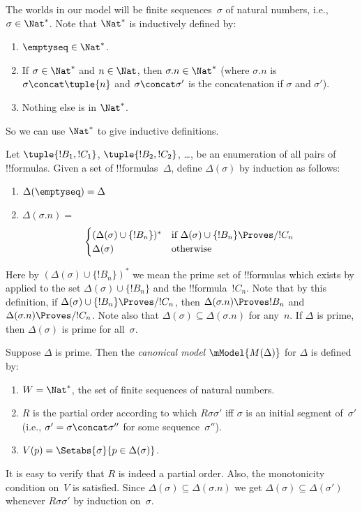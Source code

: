 \documentclass[../../../include/open-logic-section]{subfiles}
\begin{document}


The worlds in our model will be finite sequences~$\sigma$ of natural
numbers, i.e., $\sigma \in \Nat^*$. Note that $\Nat^*$ is inductively
defined by:
\begin{enumerate}
\item $\emptyseq \in \Nat^*$.
\item If $\sigma \in \Nat^*$ and $n \in \Nat$, then $\sigma.n \in
  \Nat^*$ (where $\sigma.n$ is $\sigma \concat \tuple{n}$ and $\sigma \concat \sigma'$ is the concatenation if $\sigma$ and $\sigma'$).
\item Nothing else is in $\Nat^*$.
\end{enumerate}
So we can use $\Nat^*$ to give inductive definitions.

Let $\tuple{!B_1, !C_1}$, $\tuple{!B_2, !C_2}$, \dots, be an
enumeration of all pairs of !!{formula}s. Given a set of
!!{formula}s~$\Delta$, define $\Delta(\sigma)$ by induction as
follows:
\begin{enumerate}
\item $\Delta(\emptyseq) = \Delta$
\item $\Delta(\sigma.n) = {}$
  \[
  \begin{cases}
    (\Delta(\sigma) \cup \{!B_n\})^* &
    \text{if $\Delta(\sigma) \cup \{!B_n\} \Proves/ !C_n$} \\
    \Delta(\sigma) & \text{otherwise}
  \end{cases}
  \]
\end{enumerate}
Here by $(\Delta(\sigma) \cup \{!B_n\})^*$ we mean the prime set of
!!{formula}s which exists by  applied to the
set $\Delta(\sigma) \cup \{!B_n\}$ and the !!{formula}~$!C_n$. Note that by this definition, if
$\Delta(\sigma) \cup \{!B_n\} \Proves/ !C_n$, then $\Delta(\sigma.n)
\Proves !B_n$ and $\Delta(\sigma.n) \Proves/ !C_n$.  Note also that
$\Delta(\sigma) \subseteq \Delta(\sigma.n)$ for any~$n$. If $\Delta$
is prime, then $\Delta(\sigma)$ is prime for all~$\sigma$.

\begin{defn}
  Suppose $\Delta$ is prime.  Then the \emph{canonical model} $\mModel{M(\Delta)}$ for
  $\Delta$ is defined by:
  \begin{enumerate}
  \item $W = \Nat^*$, the set of finite sequences of natural numbers.
  \item $R$ is the partial order according to which $R\sigma\sigma'$
    iff $\sigma$ is an initial segment of~$\sigma'$ (i.e., $\sigma' =
    \sigma \concat \sigma''$ for some sequence~$\sigma''$).
  \item $V(p) = \Setabs{\sigma}{p \in \Delta(\sigma)}$.
  \end{enumerate}
\end{defn}

It is easy to verify that $R$ is indeed a partial order. Also, the
monotonicity condition on~$V$ is satisfied.  Since $\Delta(\sigma)
\subseteq \Delta(\sigma.n)$ we get $\Delta(\sigma)
\subseteq \Delta(\sigma')$ whenever $R\sigma\sigma'$ by induction
on~$\sigma$.
\end{document}
